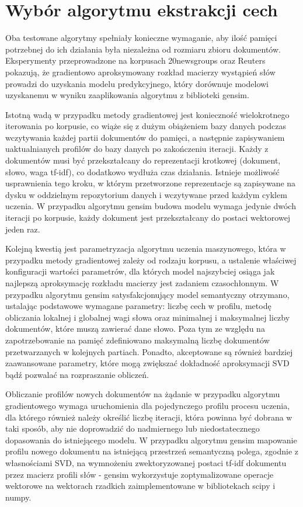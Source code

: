 \documentclass{pracamgr}
\begin{document}
\section{Wybór algorytmu ekstrakcji cech}
Oba testowane algorytmy spełniały konieczne wymaganie, aby ilość pamięci potrzebnej do ich działania była niezależna od rozmiaru zbioru dokumentów. Eksperymenty przeprowadzone na korpusach 20newsgroups oraz Reuters pokazują, że gradientowo aproksymowany rozkład macierzy wystąpień słów prowadzi do uzyskania modelu predykcyjnego, który dorównuje modelowi uzyskanemu w wyniku zaaplikowania algorytmu z biblioteki gensim.

Istotną wadą w przypadku metody gradientowej jest konieczność wielokrotnego iterowania po korpusie, co wiąże się z dużym obiążeniem bazy danych podczas wczytywania każdej partii dokumentów do pamięci, a następnie zapisywaniem uaktualnianych profilów do bazy danych po zakończeniu iteracji. Każdy z dokumentów musi być przekształcany do reprezentacji krotkowej (dokument, słowo, waga tf-idf), co dodatkowo wydłuża czas działania. Istnieje możliwość usprawnienia tego kroku, w którym przetworzone reprezentacje są zapisywane na dysku w oddzielnym repozytorium danych i wczytywane przed każdym cyklem uczenia. W przypadku algorytmu gensim budowa modelu wymaga jedynie dwóch iteracji po korpusie, każdy dokument jest przekształcany do postaci wektorowej jeden raz. 

Kolejną kwestią jest parametryzacja algorytmu uczenia maszynowego, która w przypadku metody gradientowej zależy od rodzaju korpusu, a ustalenie właściwej konfiguracji wartości parametrów, dla których model najszybciej osiąga jak najlepszą aproksymację rozkładu macierzy jest zadaniem czasochłonnym. W przypadku algorytmu gensim satysfakcjonujący model semantyczny otrzymano, ustalając podstawowe wymagane parametry: liczbę cech w profilu, metodę obliczania lokalnej i globalnej wagi słowa oraz minimalnej i maksymalnej liczby dokumentów, które muszą zawierać dane słowo. Poza tym ze względu na zapotrzebowanie na pamięć zdefiniowano maksymalną liczbę dokumentów przetwarzanych w kolejnych partiach. Ponadto, akceptowane są również bardziej zaawansowane parametry, które mogą zwiększać dokładność aproksymacji SVD bądź pozwalać na rozpraszanie obliczeń.

Obliczanie profilów nowych dokumentów na żądanie w przypadku algorytmu gradientowego wymaga uruchomienia dla pojedynczego profilu procesu uczenia, dla którego również należy określić liczbę iteracji, która powinna być dobrana w taki sposób, aby nie doprowadzić do nadmiernego lub niedostatecznego dopasowania do istniejącego modelu. W przypadku algorytmu gensim mapowanie profilu nowego dokumentu na istniejącą przestrzeń semantyczną polega, zgodnie z własnościami SVD, na wymnożeniu zwektoryzowanej postaci tf-idf dokumentu przez macierz profili słów - gensim wykorzystuje zoptymalizowane operacje wektorowe na wektorach rzadkich zaimplementowane w bibliotekach scipy i numpy.
\end{document}
